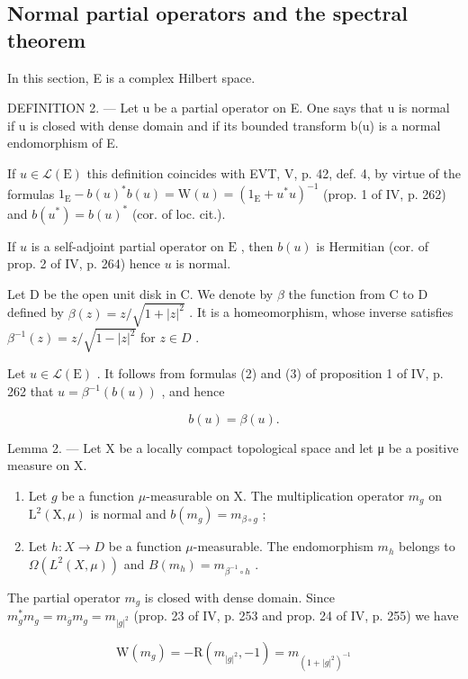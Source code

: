 \subsection{Normal partial operators and the spectral theorem}

In this section, E is a complex Hilbert space.

DEFINITION 2. --- Let u be a partial operator on E. One says that u is normal if u is closed with dense domain and if its bounded transform b(u) is a normal endomorphism of E.

If \(u \in \mathcal{L}(\mathrm{E})\) this definition coincides with EVT, V, p. 42, def. 4, by virtue of the formulas \(1_{\mathrm{E}} - b(u)^{*}b(u) = \mathrm{W}(u) = (1_{\mathrm{E}} + u^{*}u)^{-1}\) (prop. 1 of IV, p. 262) and \(b(u^{*}) = b(u)^{*}\) (cor. of loc. cit.).

If \(u\) is a self-adjoint partial operator on \(\mathrm{E}\) , then \(b(u)\) is Hermitian (cor. of prop. 2 of IV, p. 264) hence \(u\) is normal.

Let D be the open unit disk in C. We denote by \(\beta\) the function from C to D defined by \(\beta(z)=z/\sqrt{1+|z|^{2}}\) . It is a homeomorphism, whose inverse satisfies \(\beta^{-1}(z)=z/\sqrt{1-|z|^{2}}\) for \(z\in D\) .

Let \(u \in \mathcal{L}(\mathrm{E})\) . It follows from formulas (2) and (3) of proposition 1 of IV, p. 262 that \(u = \beta^{-1}(b(u))\) , and hence

\[
b (u) = \beta (u).\tag{5}
\]

Lemma 2. --- Let X be a locally compact topological space and let μ be a positive measure on X.

\begin{enumerate}
\def\labelenumi{\alph{enumi})}
\item
  Let \(g\) be a function \(\mu\)-measurable on X. The multiplication operator \(m_g\) on \(\mathrm{L}^2 (\mathrm{X},\mu)\) is normal and \(b(m_g) = m_{\beta \circ g}\) ;
\item
  Let \(h\colon X\to D\) be a function \(\mu\)-measurable. The endomorphism \(m_h\) belongs to \(\Omega(L^2(X,\mu))\) and \(B(m_h)=m_{\beta^{-1}\circ h}\) .
\end{enumerate}

The partial operator \(m_g\) is closed with dense domain. Since \(m_g^* m_g = m_{\overline{g}} m_g = m_{|g|^2}\) (prop. 23 of IV, p. 253 and prop. 24 of IV, p. 255) we have

\[
\mathrm{W} (m _ {g}) = - \mathrm{R} (m _ {| g | ^ {2}}, - 1) = m _ {(1 + | g | ^ {2}) ^ {- 1}}
\]

